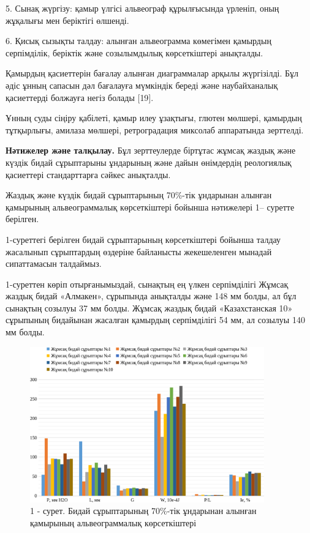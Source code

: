 \begin{multicols}{2}
5. Сынақ жүргізу: қамыр үлгісі альвеограф құрылғысында үрленіп, оның
жұқалығы мен беріктігі өлшенді.

6. Қисық сызықты талдау: алынған альвеограмма көмегімен қамырдың
серпімділік, беріктік және созылымдылық көрсеткіштері анықталды.

Қамырдың қасиеттерін бағалау алынған диаграммалар арқылы жүргізілді. Бұл
әдіс ұнның сапасын дәл бағалауға мүмкіндік береді және наубайханалық
қасиеттерді болжауға негіз болады {[}19{]}.

Ұнның суды сіңіру қабілеті, қамыр илеу ұзақтығы, глютен мөлшері,
қамырдың тұтқырлығы, амилаза мөлшері, ретроградация миксолаб аппаратында
зерттелді.

{\bfseries Нәтижелер және талқылау.} Бұл зерттеулерде біртұтас жұмсақ
жаздық және күздік бидай сұрыптарыны ұндарының және дайын өнімдердің
реологиялық қасиеттері стандарттарға сәйкес анықталды.

Жаздық және күздік бидай сұрыптарының 70\%-тік ұндарынан алынған
қамырының альвеограммалық көрсеткіштері бойынша нәтижелері 1-- суретте
берілген.

1-суреттегі берілген бидай сұрыптарының көрсеткіштері бойынша талдау
жасалынып сұрыптардың өздеріне байланысты жекешеленген мынадай
сипаттамасын талдаймыз.

1-суреттен көріп отырғанымыздай, сынақтың ең үлкен серпімділігі Жұмсақ
жаздық бидай «Алмакен», сұрыпында анықталды және 148 мм болды, ал бұл
сынақтың созылуы 37 мм болды. Жұмсақ жаздық бидай «Казахстанская 10»
сұрыпының бидайынан жасалған қамырдың серпімділігі 54 мм, ал созылуы 140
мм болды.
\end{multicols}

\begin{figure}[H]
	\centering
	\includegraphics[width=0.9\textwidth]{media/pish2/image29}
	\caption*{1 - сурет. Бидай сұрыптарының 70\%-тік ұндарынан алынған қамырының альвеограммалық көрсеткіштері}
\end{figure}


